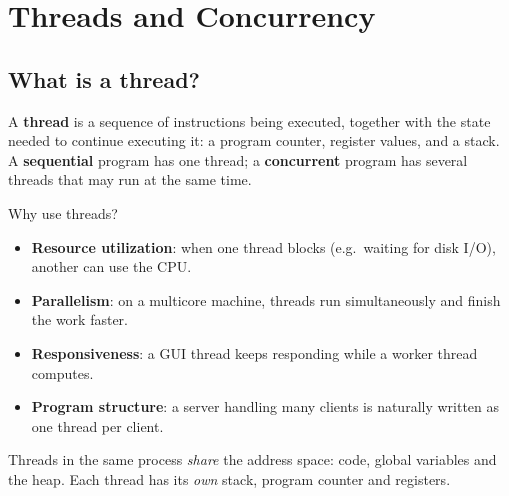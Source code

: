 \chapter{Threads and Concurrency}

\section{What is a thread?}

\begin{definition}[Thread]
A \textbf{thread} is a sequence of instructions being executed, together with the state needed to
continue executing it: a program counter, register values, and a stack. A \textbf{sequential}
program has one thread; a \textbf{concurrent} program has several threads that may run at the
same time.
\end{definition}

Why use threads?
\begin{itemize}
  \item \textbf{Resource utilization}: when one thread blocks (e.g.\ waiting for disk I/O),
    another can use the CPU.
  \item \textbf{Parallelism}: on a multicore machine, threads run simultaneously and finish
    the work faster.
  \item \textbf{Responsiveness}: a GUI thread keeps responding while a worker thread computes.
  \item \textbf{Program structure}: a server handling many clients is naturally written as
    one thread per client.
\end{itemize}

Threads in the same process \emph{share} the address space: code, global variables and the heap.
Each thread has its \emph{own} stack, program counter and registers.

\begin{center}
\end{center}

